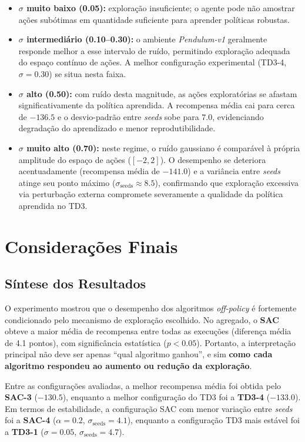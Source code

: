\documentclass{Supervised_Reinforcement_Learningqsport}
\begin{document}
\begin{itemize}
    \item \textbf{$\sigma$ muito baixo (0.05):} exploração insuficiente; o agente pode não amostrar ações subótimas em quantidade suficiente para aprender políticas robustas.

    \item \textbf{$\sigma$ intermediário (0.10--0.30):} o ambiente \textit{Pendulum-v1} geralmente responde melhor a esse intervalo de ruído, permitindo exploração adequada do espaço contínuo de ações. A melhor configuração experimental (TD3-4, $\sigma=0.30$) se situa nesta faixa.

    \item \textbf{$\sigma$ alto (0.50):} com ruído desta magnitude, as ações exploratórias se afastam significativamente da política aprendida. A recompensa média cai para cerca de $-136.5$ e o desvio-padrão entre \textit{seeds} sobe para $7.0$, evidenciando degradação do aprendizado e menor reprodutibilidade.

    \item \textbf{$\sigma$ muito alto (0.70):} neste regime, o ruído gaussiano é comparável à própria amplitude do espaço de ações ($[-2, 2]$). O desempenho se deteriora acentuadamente (recompensa média de $-141.0$) e a variância entre \textit{seeds} atinge seu ponto máximo ($\sigma_{\text{seeds}} \approx 8.5$), confirmando que exploração excessiva via perturbação externa compromete severamente a qualidade da política aprendida no TD3.
\end{itemize}

\section{Considerações Finais}

\subsection{Síntese dos Resultados}
O experimento mostrou que o desempenho dos algoritmos \textit{off-policy} é fortemente condicionado pelo mecanismo de exploração escolhido. No agregado, o \textbf{SAC} obteve a maior média de recompensa entre todas as execuções (diferença média de 4.1 pontos), com significância estatística ($p < 0.05$). Portanto, a interpretação principal não deve ser apenas ``qual algoritmo ganhou'', e sim \textbf{como cada algoritmo respondeu ao aumento ou redução da exploração}.

Entre as configurações avaliadas, a melhor recompensa média foi obtida pelo \textbf{SAC-3} ($-130.5$), enquanto a melhor configuração do TD3 foi a \textbf{TD3-4} ($-133.0$). Em termos de estabilidade, a configuração SAC com menor variação entre \textit{seeds} foi a \textbf{SAC-4} ($\alpha=0.2$, $\sigma_{\text{seeds}}=4.1$), enquanto a configuração TD3 mais estável foi a \textbf{TD3-1} ($\sigma=0.05$, $\sigma_{\text{seeds}}=4.7$).
\end{document}
